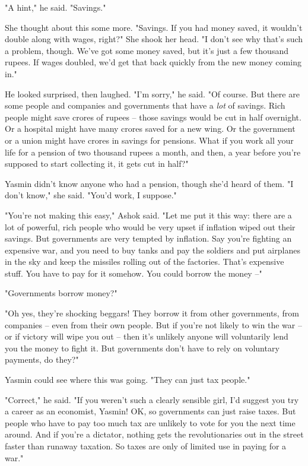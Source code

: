 "A hint," he said. "Savings."

She thought about this some more. "Savings. If you had money saved,
it wouldn't double along with wages, right?" She shook her head. "I
don't see why that's such a problem, though. We've got some money
saved, but it's just a few thousand rupees. If wages doubled, we'd
get that back quickly from the new money coming in."

He looked surprised, then laughed. "I'm sorry," he said. "Of
course. But there are some people and companies and governments
that have a \emph{lot} of savings. Rich people might save crores of
rupees -- those savings would be cut in half overnight. Or a
hospital might have many crores saved for a new wing. Or the
government or a union might have crores in savings for pensions.
What if you work all your life for a pension of two thousand rupees
a month, and then, a year before you're supposed to start
collecting it, it gets cut in half?"

Yasmin didn't know anyone who had a pension, though she'd heard of
them. "I don't know," she said. "You'd work, I suppose."

"You're not making this easy," Ashok said. "Let me put it this way:
there are a lot of powerful, rich people who would be very upset if
inflation wiped out their savings. But governments are very tempted
by inflation. Say you're fighting an expensive war, and you need to
buy tanks and pay the soldiers and put airplanes in the sky and
keep the missiles rolling out of the factories. That's expensive
stuff. You have to pay for it somehow. You could borrow the money
--"

"Governments borrow money?"

"Oh yes, they're shocking beggars! They borrow it from other
governments, from companies -- even from their own people. But if
you're not likely to win the war -- or if victory will wipe you out
-- then it's unlikely anyone will voluntarily lend you the money to
fight it. But governments don't have to rely on voluntary payments,
do they?"

Yasmin could see where this was going. "They can just tax people."

"Correct," he said. "If you weren't such a clearly sensible girl,
I'd suggest you try a career as an economist, Yasmin! OK, so
governments can just raise taxes. But people who have to pay too
much tax are unlikely to vote for you the next time around. And if
you're a dictator, nothing gets the revolutionaries out in the
street faster than runaway taxation. So taxes are only of limited
use in paying for a war."

